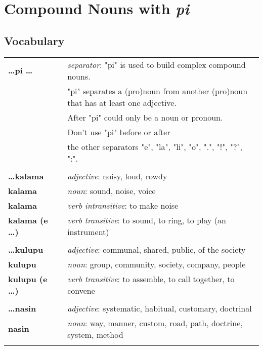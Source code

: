 \section{Compound Nouns with \textit{pi}}
%
\subsection*{Vocabulary}
%
\begin{supertabular}{p{2,5cm}|ll}
\textbf{\dots pi \dots } && \textit{separator}: "pi" is used to build complex compound nouns. \\ && "pi" separates a (pro)noun from another (pro)noun that has at least one adjective. \\ && After "pi" could only be a noun or pronoun. \\ && Don't use "pi" before or after \\ && the other separators "e", "la", "li", "o", ".", "!", "?", ":".  \\ %
 && \\ %
\textbf{\dots kalama} && \textit{adjective}: noisy, loud, rowdy \\ %
\textbf{kalama} && \textit{noun}: sound, noise, voice \\ 
\textbf{kalama} && \textit{verb intransitive}: to make noise \\ %
\textbf{kalama (e \dots)} && \textit{verb transitive}: to sound, to ring, to play (an instrument) \\ %
 && \\ %
\textbf{\dots kulupu} && \textit{adjective}: communal, shared, public, of the society \\ %
\textbf{kulupu} && \textit{noun}: group, community, society, company, people \\ %
\textbf{kulupu (e \dots)} && \textit{verb transitive}: to assemble, to call together, to convene \\ %
 && \\ %
\textbf{\dots nasin} && \textit{adjective}: systematic, habitual, customary, doctrinal \\ %
\textbf{nasin} && \textit{noun}: way, manner, custom, road, path, doctrine, system, method \\ %
 && \\ %
\end{supertabular} \\
%
